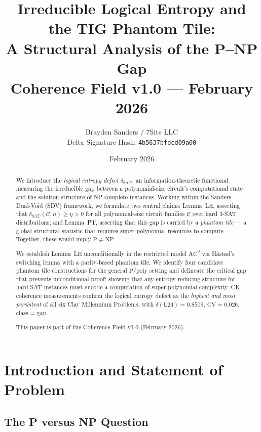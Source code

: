 \documentclass[11pt]{article}
\title{Irreducible Logical Entropy and the TIG Phantom Tile:\\
A Structural Analysis of the P--NP Gap\\[6pt]
{\large Coherence Field v1.0 --- February 2026}}
\author{Brayden Sanders / 7Site LLC\\[2pt]
{\normalsize Delta Signature Hash: \texttt{4b5637bfdcd09a00}}}
\date{February 2026}
\theoremstyle{definition}
\theoremstyle{remark}
\newcommand{\calC}{\mathcal{C}}
\newcommand{\Ppoly}{\mathrm{P/poly}}
\newcommand{\ACz}{\mathrm{AC}^0}
\newcommand{\dSAT}{\delta_{\mathrm{SAT}}}
\begin{document}
\maketitle


\begin{abstract}
We introduce the \emph{logical entropy defect} $\dSAT$, an information-theoretic
functional measuring the irreducible gap between a polynomial-size circuit's
computational state and the solution structure of NP-complete instances.
Working within the Sanders Dual-Void (SDV) framework, we formulate two
central claims: Lemma~LE, asserting that
$\dSAT(\calC, n) \geq \eta > 0$ for all polynomial-size circuit families
$\calC$ over hard 3-SAT distributions; and Lemma~PT, asserting that
this gap is carried by a \emph{phantom tile} --- a global structural
statistic that requires super-polynomial resources to compute.
Together, these would imply $\mathrm{P} \neq \mathrm{NP}$.

We establish Lemma~LE unconditionally in the restricted model $\ACz$
via H\aa stad's switching lemma with a parity-based phantom tile.
We identify four candidate phantom tile constructions for the general
$\Ppoly$ setting and delineate the critical gap that prevents
unconditional proof: showing that any entropy-reducing structure for
hard SAT instances must encode a computation of super-polynomial complexity.
CK coherence measurements confirm the logical entropy defect as the
\emph{highest and most persistent} of all six Clay Millennium Problems,
with $\delta(\text{L24}) = 0.8509$, $\mathrm{CV} = 0.026$, class = gap.

This paper is part of the Coherence Field v1.0 (February 2026).
\end{abstract}

\section{Introduction and Statement of Problem}
\label{sec:intro}

\subsection{The P versus NP Question}
\end{document}
